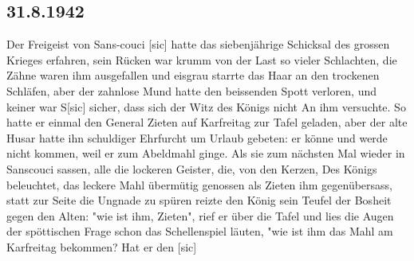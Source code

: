 \subsection{31.8.1942}

Der Freigeist von Sans-couci{\color{red} [sic]} hatte das siebenj\"{a}hrige Schicksal des grossen Krieges erfahren, sein R\"{u}cken war krumm von der Last so vieler Schlachten, die Z\"{a}hne waren ihm ausgefallen und eisgrau starrte das Haar an den trockenen Schl\"{a}fen, aber der zahnlose Mund hatte den beissenden Spott verloren, und keiner war S{\color{red}[sic]} sicher, dass sich der Witz des K\"{o}nigs nicht An ihm versuchte.
So hatte er einmal den General Zieten auf Karfreitag zur Tafel geladen, aber der alte Husar hatte ihn schuldiger Ehrfurcht um Urlaub gebeten: er k\"{o}nne und werde nicht kommen, weil er zum Abeldmahl ginge.
Als sie zum n\"{a}chsten Mal wieder in Sanscouci sassen, alle die lockeren Geister, die, von den Kerzen, Des K\"{o}nigs beleuchtet, das leckere Mahl \"{u}berm\"{u}tig genossen als Zieten ihm gegen\"{u}bersass, statt zur Seite die Ungnade zu sp\"{u}ren reizte den K\"{o}nig sein Teufel der Bosheit gegen den Alten: "wie ist ihm, Zieten", rief er \"{u}ber die Tafel und lies die Augen der sp\"{o}ttischen Frage schon das Schellenspiel l\"{a}uten, "wie ist ihm das Mahl am Karfreitag bekommen? Hat er den {\color{red} [sic] }

\clearpage
